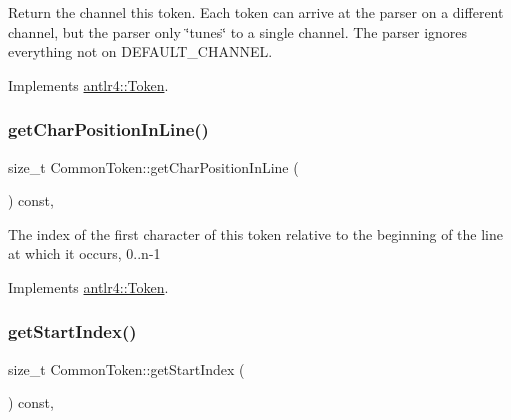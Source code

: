 Return the channel this token. Each token can arrive at the parser on a different channel, but the parser only \char`\"{}tunes\char`\"{} to a single channel. The parser ignores everything not on D\+E\+F\+A\+U\+L\+T\+\_\+\+C\+H\+A\+N\+N\+EL. 

Implements \hyperlink{classantlr4_1_1Token_a92991c0566e4cb00ae2c5f9e7d8fe6b4}{antlr4\+::\+Token}.

\mbox{\label{classantlr4_1_1CommonToken_aa1d6ebf145f7eac65ac809f273fff0c7}} 
\subsubsection{\texorpdfstring{get\+Char\+Position\+In\+Line()}{getCharPositionInLine()}}
{\footnotesize\ttfamily size\+\_\+t Common\+Token\+::get\+Char\+Position\+In\+Line (\begin{DoxyParamCaption}{ }\end{DoxyParamCaption}) const\hspace{0.3cm}{\ttfamily [override]}, {\ttfamily [virtual]}}

The index of the first character of this token relative to the beginning of the line at which it occurs, 0..n-\/1 

Implements \hyperlink{classantlr4_1_1Token_af4e82682816ba4166068e5b525dee31d}{antlr4\+::\+Token}.

\mbox{\label{classantlr4_1_1CommonToken_a6addf2e880a348bac29b68f8c919e4a5}} 
\subsubsection{\texorpdfstring{get\+Start\+Index()}{getStartIndex()}}
{\footnotesize\ttfamily size\+\_\+t Common\+Token\+::get\+Start\+Index (\begin{DoxyParamCaption}{ }\end{DoxyParamCaption}) const\hspace{0.3cm}{\ttfamily [override]}, {\ttfamily [virtual]}}

